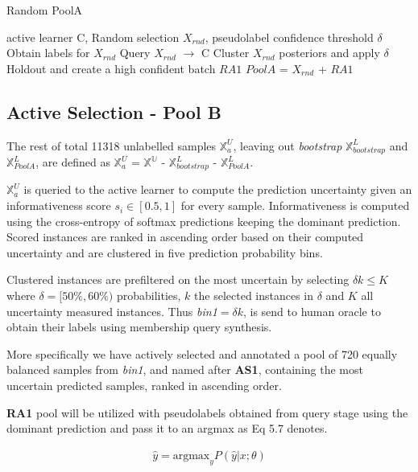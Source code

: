 \begin{algorithm}
\caption{Random PoolA}
\label{c5:algorithm_ab_poola}
\begin{algorithmic}[1]
\Require active learner C, Random selection $X_{rnd}$, pseudolabel confidence threshold $\delta$
    \State Obtain labels for $X_{rnd}$
    \State Query $X_{rnd}$ $\rightarrow$ C
    \State Cluster $X_{rnd}$ posteriors and apply $\delta$
    \State Holdout and create a high confident batch $RA1$
    \State $PoolA$ = $X_{rnd}$ + $RA1$
\EndProcedure
\end{algorithmic}
\end{algorithm}



\subsection{Active Selection - Pool B}
\label{c5:section_active_poolb}
The rest of total 11318 unlabelled samples $\mathbb{X}^U_a$, leaving out
\textit{bootstrap} $\mathbb{X}^L_{bootstrap}$ and $\mathbb{X}^L_{PoolA}$,
are defined as $\mathbb{X}^U_a$ = $\mathbb{X^U}$ - $\mathbb{X}^L_{bootstrap}$ - $\mathbb{X}^L_{PoolA}$.

$\mathbb{X}^U_a$ is queried to the active learner to compute the prediction uncertainty given an informativeness score $s_i \in [0.5,1]$ for every sample. Informativeness is computed using the cross-entropy of softmax predictions keeping the dominant prediction. Scored instances are ranked in ascending order based on their computed uncertainty and are clustered in five prediction probability bins.

Clustered instances are prefiltered on the most uncertain by selecting $\delta k \leq K$ where $\delta= [50\%,60\%)$ probabilities, $k$ the selected instances in $\delta$ and $K$ all uncertainty measured instances.
Thus \textit{bin1}$=\delta k$, is send to human oracle to obtain their labels using membership query synthesis.

More specifically we have actively selected and annotated a pool of 720 equally balanced samples from \textit{bin1}, and named after \textbf{AS1}, containing the most uncertain predicted samples, ranked in ascending order.

\textbf{RA1} pool will be utilized with pseudolabels obtained from query stage using the dominant prediction and pass it to an argmax as Eq 5.7 denotes.

\begin{ceqn}
\begin{align}
    \hat{y} = \text{argmax}_y P(\hat{y}|x;\theta)
\end{align} 
\label{c5:eq_argmax}
\end{ceqn}

